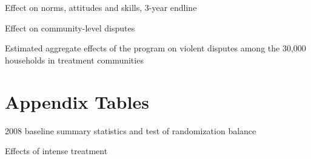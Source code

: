 \documentclass[10pt]{article}
\begin{document}
\begin{table}[H]
\caption{Effect on norms, attitudes and skills, 3-year endline}
\begin{center}
\begin{adjustbox}{max width = \textwidth}

\end{adjustbox}
\end{center}
\end{table}

\begin{table}[H]
\caption{Effect on community-level disputes}
\begin{center}
\begin{adjustbox}{max width = \textwidth}

\end{adjustbox}
\end{center}
\end{table}

\begin{table}[H]
\caption{Estimated aggregate effects of the program on violent disputes among the 30,000 households in treatment communities}
\begin{center}
\begin{adjustbox}{max width = \textwidth}

\end{adjustbox}
\end{center}
\end{table}

\section{Appendix Tables}
\clearpage
\setcounter{table}{0}   
\renewcommand{\thetable}{A.\arabic{table}}

\begin{table}[H]
\caption{2008 baseline summary statistics and test of randomization balance}
\begin{center}
\begin{adjustbox}{max width = \textwidth}
\end{adjustbox}
\end{center}
\end{table}


\begin{table}[H]
\caption{Effects of intense treatment}
\begin{center}
\begin{adjustbox}{max width = \textwidth}

\end{adjustbox}
\end{center}
\end{table}
\end{document}
